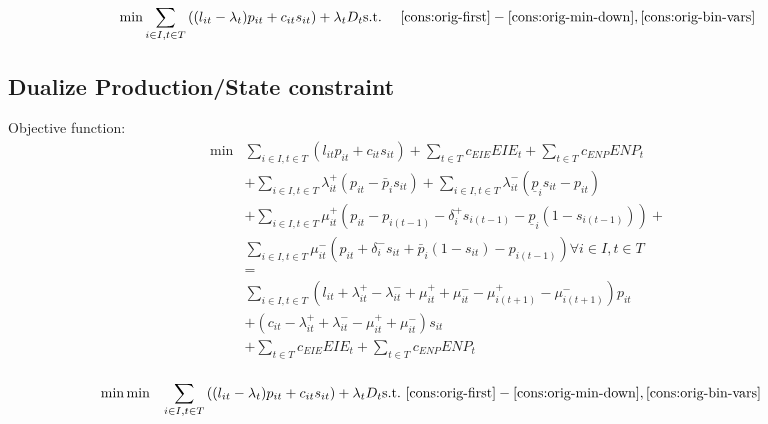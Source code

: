 \documentclass[12pt, a4paper]{article}
\begin{document}
  \begin{align}
     \min &\sum_{i\in I, t\in T} \left ( (l_{it} -\lambda_t) p_{it} + c_{it} s_{it} \right ) + \lambda_t D_t
  \text{s.t.~} & \eqref{cons:orig-first}-\eqref{cons:orig-min-down}, \eqref{cons:orig-bin-vars} 
\end{align}

\subsection*{Dualize Production/State constraint}

Objective function:
\begin{align*}
  \min &\sum_{i\in I, t\in T} \left ( l_{it} p_{it} + c_{it} s_{it} \right ) + \sum_{t\in T} c_{EIE} EIE_t + \sum_{t\in T} c_{ENP} ENP_t  \\
       & + \sum_{i\in I, t\in T} \lambda^+_{it} (p_{it} - \bar{p}_i s_{it}) + \sum_{i\in I, t\in T} \lambda^-_{it} (\underline{p}_{i} s_{it} - p_{it})   \\
       & + \sum_{i\in I, t\in T} \mu^+_{it} (p_{it} - p_{i(t-1)} - \delta^+_i s_{i(t-1)}  - \underline{p}_i (1 - s_{i(t-1)})) + \\
  &\sum_{i\in I, t\in T} \mu^-_{it} (p_{it} + \delta^-_{i} s_{it}  + \bar{p}_i (1 - s_{it}) - p_{i(t-1)}) \forall i\in I, t \in T\\
       &=\\
       & \sum_{i\in I, t\in T} (l_{it} + \lambda^+_{it} - \lambda^-_{it} + \mu^+_{it} + \mu^-_{it} - \mu^+_{i(t+1)} -\mu^-_{i(t+1)} )  p_{it}\\
       & + (c_{it} - \lambda^+_{it} + \lambda^-_{it} - \mu^+_{it} + \mu^-_{it})  s_{it}  \\ & + \sum_{t\in T} c_{EIE} EIE_t + \sum_{t\in T} c_{ENP} ENP_t  \\
\end{align*}

  \begin{align}
  \min &    \min &\sum_{i\in I, t\in T} \left ( (l_{it} -\lambda_t) p_{it} + c_{it} s_{it} \right ) + \lambda_t D_t
  \text{s.t.~} & \eqref{cons:orig-first}-\eqref{cons:orig-min-down}, \eqref{cons:orig-bin-vars} 
\end{align}
\end{document}
